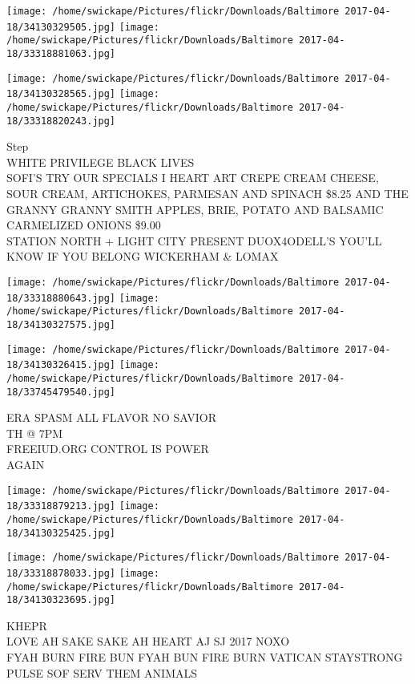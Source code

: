 \documentclass[10pt,letterpaper]{article}
\begin{document}
\texttt{[image: /home/swickape/Pictures/flickr/Downloads/Baltimore 2017-04-18/34130329505.jpg]}
\texttt{[image: /home/swickape/Pictures/flickr/Downloads/Baltimore 2017-04-18/33318881063.jpg]}

\texttt{[image: /home/swickape/Pictures/flickr/Downloads/Baltimore 2017-04-18/34130328565.jpg]}
\texttt{[image: /home/swickape/Pictures/flickr/Downloads/Baltimore 2017-04-18/33318820243.jpg]}

Step\\
WHITE PRIVILEGE BLACK LIVES\\
SOFI'S TRY OUR SPECIALS I HEART ART CREPE CREAM CHEESE, SOUR CREAM, ARTICHOKES, PARMESAN AND SPINACH \$8.25 AND THE GRANNY GRANNY SMITH APPLES, BRIE, POTATO AND BALSAMIC CARMELIZED ONIONS \$9.00\\
STATION NORTH + LIGHT CITY PRESENT DUOX4ODELL'S YOU'LL KNOW IF YOU BELONG WICKERHAM \& LOMAX
\pagebreak

\texttt{[image: /home/swickape/Pictures/flickr/Downloads/Baltimore 2017-04-18/33318880643.jpg]}
\texttt{[image: /home/swickape/Pictures/flickr/Downloads/Baltimore 2017-04-18/34130327575.jpg]}

\texttt{[image: /home/swickape/Pictures/flickr/Downloads/Baltimore 2017-04-18/34130326415.jpg]}
\texttt{[image: /home/swickape/Pictures/flickr/Downloads/Baltimore 2017-04-18/33745479540.jpg]}

ERA SPASM ALL FLAVOR NO SAVIOR\\
TH @ 7PM\\
FREEIUD.ORG CONTROL IS POWER\\
AGAIN
\pagebreak

\texttt{[image: /home/swickape/Pictures/flickr/Downloads/Baltimore 2017-04-18/33318879213.jpg]}
\texttt{[image: /home/swickape/Pictures/flickr/Downloads/Baltimore 2017-04-18/34130325425.jpg]}

\texttt{[image: /home/swickape/Pictures/flickr/Downloads/Baltimore 2017-04-18/33318878033.jpg]}
\texttt{[image: /home/swickape/Pictures/flickr/Downloads/Baltimore 2017-04-18/34130323695.jpg]}

KHEPR\\
LOVE AH SAKE SAKE AH HEART AJ SJ 2017 NOXO\\
FYAH BURN FIRE BUN FYAH BUN FIRE BURN VATICAN STAYSTRONG\\
PULSE SOF SERV THEM ANIMALS
\pagebreak
\end{document}
